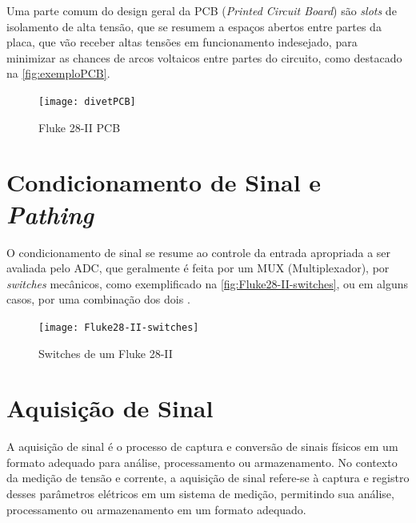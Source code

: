         Uma parte comum do design geral da \gls{PCB} (\textit{Printed Circuit Board}) são \textit{slots} de isolamento de alta tensão, que se resumem a espaços abertos entre partes da placa, que vão receber altas tensões em funcionamento indesejado, para minimizar as chances de arcos voltaicos entre partes do circuito, como destacado na \autoref{fig:exemploPCB}. %

        \begin{figure}[htb!]%
            \caption{Fluke 28-II PCB}%
            \label{fig:exemploPCB}%
            \texttt{[image: divetPCB]}%
        \end{figure}  

 \section{Condicionamento de Sinal e \textit{Pathing}}\label{sec:signalConditioningandPathing}

O condicionamento de sinal se resume ao controle da entrada apropriada a ser avaliada pelo ADC, que geralmente é feita por um \gls{MUX} (Multiplexador), por \textit{switches} mecânicos, como exemplificado na \autoref{fig:Fluke28-II-switches}, ou em alguns casos, por uma combinação dos dois \cite{dmmblog}.
        
\begin{figure}[htb!]%
    \caption{Switches de um Fluke 28-II}%
    \label{fig:Fluke28-II-switches}%
    \texttt{[image: Fluke28-II-switches]}%
\end{figure}

\section{Aquisição de Sinal}\label{sec:aqSignal}

A aquisição de sinal é o processo de captura e conversão de sinais físicos em um formato adequado para análise, processamento ou armazenamento. No contexto da medição de tensão e corrente, a aquisição de sinal refere-se à captura e registro desses parâmetros elétricos em um sistema de medição, permitindo sua análise, processamento ou armazenamento em um formato adequado.

